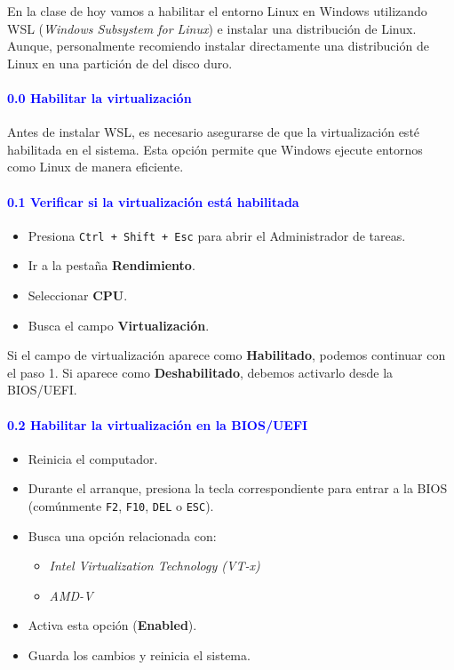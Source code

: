 \documentclass[12pt]{article}
\begin{document}
\noindent En la clase de hoy vamos a habilitar el entorno Linux en Windows utilizando
WSL (\textit{Windows Subsystem for Linux}) e instalar una distribución de Linux. 
Aunque, personalmente recomiendo instalar directamente una distribución de Linux en una partición de
del disco duro.

\paragraph{\textcolor{blue}{0.0 Habilitar la virtualización}}
Antes de instalar WSL, es necesario asegurarse de que la virtualización 
esté habilitada en el sistema. 
Esta opción permite que Windows ejecute entornos como Linux de manera eficiente.

\paragraph{\textcolor{blue}{0.1 Verificar si la virtualización está habilitada}}

\begin{itemize}
    \item Presiona \texttt{Ctrl + Shift + Esc} para abrir el Administrador de tareas.
    \item Ir a la pestaña \textbf{Rendimiento}.
    \item Seleccionar \textbf{CPU}.
    \item Busca el campo \textbf{Virtualización}.
\end{itemize}
Si el campo de virtualización aparece como \textbf{Habilitado}, podemos continuar con el paso 1. 
Si aparece como \textbf{Deshabilitado}, debemos activarlo desde la BIOS/UEFI.

\paragraph{\textcolor{blue}{0.2 Habilitar la virtualización en la BIOS/UEFI}}

\begin{itemize}
    \item Reinicia el computador.
    \item Durante el arranque, presiona la tecla correspondiente para entrar a la BIOS (comúnmente \texttt{F2}, \texttt{F10}, \texttt{DEL} o \texttt{ESC}).
    \item Busca una opción relacionada con:
    \begin{itemize}
        \item \textit{Intel Virtualization Technology (VT-x)}
        \item \textit{AMD-V}
    \end{itemize}
    \item Activa esta opción (\textbf{Enabled}).
    \item Guarda los cambios y reinicia el sistema.
\end{itemize}
\end{document}
